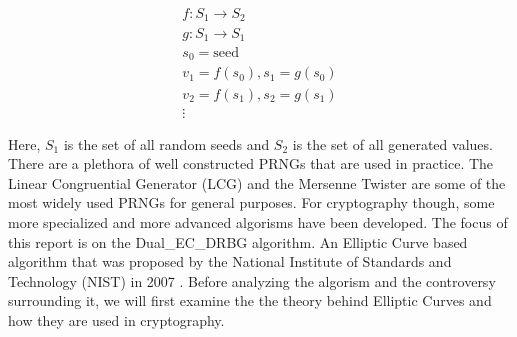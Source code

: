 \begin{gather}
    f: S_1 \rightarrow S_2 \\
    g : S_1 \rightarrow S_1\\
    s_0 = \text{seed}\\
    v_1 = f(s_0), s_1 = g(s_0) \nonumber\\
    v_2 = f(s_1), s_2 = g(s_1) \nonumber\\
    \vdots \nonumber
\end{gather}

Here, $S_1$ is the set of all random seeds and $S_2$ is the set of all generated values.
\\

There are a plethora of well constructed PRNGs that are used in practice. The Linear Congruential Generator (LCG) and the Mersenne Twister are some of the most widely used PRNGs for general purposes. For cryptography though, some more specialized and more advanced algorisms have been developed. The focus of this report is on the Dual\_EC\_DRBG algorithm. An Elliptic Curve based algorithm that was proposed by the National Institute of Standards and Technology (NIST) in 2007 \cite{nist-sp800-90}. Before analyzing the algorism and the controversy surrounding it, we will first examine the the theory behind Elliptic Curves and how they are used in cryptography.
